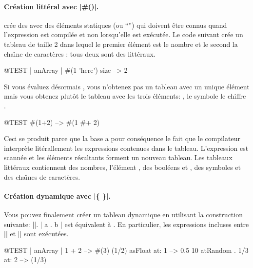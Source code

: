 \documentclass[a4paper,10pt,twoside]{book}
\begin{document}
\paragraph{Cr\'eation litt\'eral avec \ct|\#()|.}
\ct{#()} cr\'ee des  avec des \'el\'ements
statiques (ou ``'') qui doivent \^etre connus
quand l'expression est compil\'ee et non lorsqu'elle est ex\'ecut\'ee.
Le code suivant cr\'ee un tableau de taille 2
dans lequel le premier \'el\'ement est le nombre 
et le second la cha\^{\i}ne de caract\`eres : tous deux sont des litt\'eraux.


\begin{code}{@TEST | anArray |}
#(1 'here') size --> 2
\end{code}

Si vous \'evaluez d\'esormais , vous n'obtenez pas un tableau
avec un unique \'el\'ement  mais vous obtenez plut\^ot le tableau
 \ie avec les trois \'el\'ements: , le symbole
\ct{#+} le chiffre .

\begin{code}{@TEST}
#(1+2) -->  #(1 #+ 2)
\end{code}

\noindent
Ceci se produit parce que la base \ct{#()} a pour cons\'equence le fait que
le compilateur interpr\`ete lit\'erallement les expressions contenues dans
le tableau. L'expression est scann\'ee et les \'el\'ements r\'esultants
forment un nouveau tableau. Les tableaux litt\'eraux contiennent des
nombres, l'\'el\'ement , des bool\'eens  et ,
des symboles et des cha\^{\i}nes de caract\`eres.

\paragraph{Cr\'eation dynamique avec \ct|\{ \}|.}
Vous pouvez finalement cr\'eer un tableau dynamique en utilisant
la construction suivante: \ct|{}|. \ct|{ a . b }| est \'equivalent
\`a . En particulier, les expressions incluses
entre \ct|{| et \ct|}| sont ex\'ecut\'ees. 

\begin{code}{@TEST | anArray |}
{ 1 + 2 } --> #(3)
{(1/2) asFloat} at: 1 --> 0.5
{10 atRandom . 1/3} at: 2 --> (1/3)
\end{code}
\end{document}
